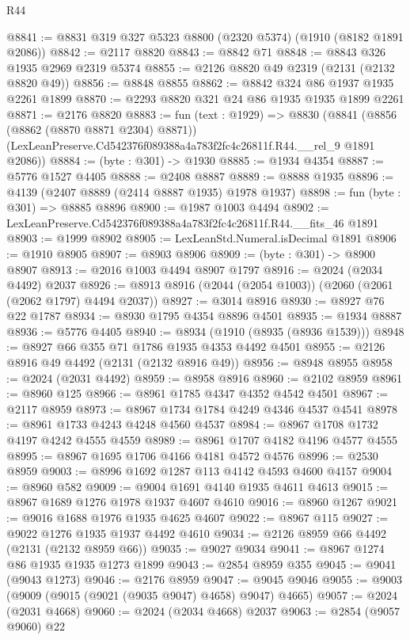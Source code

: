 \begin{lexlean}{R44}
\begin{coremodule}
@8841 := @8831 @319 @327 @5323 @8800 (@2320 @5374) (@1910 (@8182 @1891 @2086))
@8842 := @2117 @8820
@8843 := @8842 @71
@8848 := @8843 @326 @1935 @2969 @2319 @5374
@8855 := @2126 @8820 @49 @2319 (@2131 (@2132 @8820 @49))
@8856 := @8848 @8855
@8862 := @8842 @324 @86 @1937 @1935 @2261 @1899
@8870 := @2293 @8820 @321 @24 @86 @1935 @1935 @1899 @2261
@8871 := @2176 @8820
@8883 := fun (text : @1929) =>
  @8830
    (@8841
      (@8856 (@8862 (@8870 @8871 @2304) @8871))
      (LexLeanPreserve.Cd542376f089388a4a783f2fc4c26811f.R44.__rel_9 @1891 @2086))
@8884 := (byte : @301) -> @1930
@8885 := @1934 @4354
@8887 := @5776 @1527 @4405
@8888 := @2408 @8887
@8889 := @8888 @1935
@8896 := @4139 (@2407 @8889 (@2414 @8887 @1935) @1978 @1937)
@8898 := fun (byte : @301) => @8885 @8896
@8900 := @1987 @1003 @4494
@8902 := LexLeanPreserve.Cd542376f089388a4a783f2fc4c26811f.R44.__fits_46 @1891
@8903 := @1999 @8902
@8905 := LexLeanStd.Numeral.isDecimal @1891
@8906 := @1910 @8905
@8907 := @8903 @8906
@8909 := (byte : @301) -> @8900 @8907
@8913 := @2016 @1003 @4494 @8907 @1797
@8916 := @2024 (@2034 @4492) @2037
@8926 := @8913 @8916 (@2044 (@2054 @1003)) (@2060 (@2061 (@2062 @1797) @4494 @2037))
@8927 := @3014 @8916
@8930 := @8927 @76 @22 @1787
@8934 := @8930 @1795 @4354 @8896 @4501
@8935 := @1934 @8887
@8936 := @5776 @4405
@8940 := @8934 (@1910 (@8935 (@8936 @1539)))
@8948 := @8927 @66 @355 @71 @1786 @1935 @4353 @4492 @4501
@8955 := @2126 @8916 @49 @4492 (@2131 (@2132 @8916 @49))
@8956 := @8948 @8955
@8958 := @2024 (@2031 @4492)
@8959 := @8958 @8916
@8960 := @2102 @8959
@8961 := @8960 @125
@8966 := @8961 @1785 @4347 @4352 @4542 @4501
@8967 := @2117 @8959
@8973 := @8967 @1734 @1784 @4249 @4346 @4537 @4541
@8978 := @8961 @1733 @4243 @4248 @4560 @4537
@8984 := @8967 @1708 @1732 @4197 @4242 @4555 @4559
@8989 := @8961 @1707 @4182 @4196 @4577 @4555
@8995 := @8967 @1695 @1706 @4166 @4181 @4572 @4576
@8996 := @2530 @8959
@9003 := @8996 @1692 @1287 @113 @4142 @4593 @4600 @4157
@9004 := @8960 @582
@9009 := @9004 @1691 @4140 @1935 @4611 @4613
@9015 := @8967 @1689 @1276 @1978 @1937 @4607 @4610
@9016 := @8960 @1267
@9021 := @9016 @1688 @1976 @1935 @4625 @4607
@9022 := @8967 @115
@9027 := @9022 @1276 @1935 @1937 @4492 @4610
@9034 := @2126 @8959 @66 @4492 (@2131 (@2132 @8959 @66))
@9035 := @9027 @9034
@9041 := @8967 @1274 @86 @1935 @1935 @1273 @1899
@9043 := @2854 @8959 @355
@9045 := @9041 (@9043 @1273)
@9046 := @2176 @8959
@9047 := @9045 @9046
@9055 := @9003 (@9009 (@9015 (@9021 (@9035 @9047) @4658) @9047) @4665)
@9057 := @2024 (@2031 @4668)
@9060 := @2024 (@2034 @4668) @2037
@9063 := @2854 (@9057 @9060) @22

\end{coremodule}
\end{lexlean}
